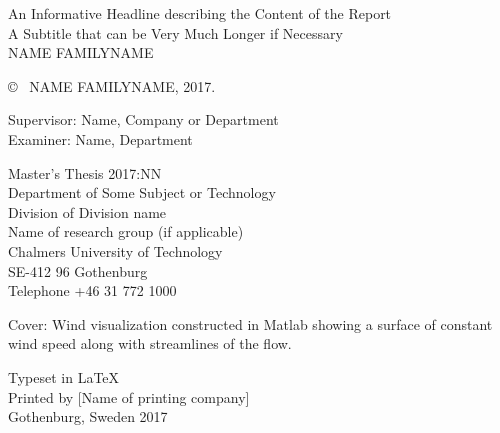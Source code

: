 \newpage
\thispagestyle{plain}
\vspace*{4.5cm}
An Informative Headline describing the Content of the Report\\
A Subtitle that can be Very Much Longer if Necessary\\
NAME FAMILYNAME \setlength{\parskip}{1cm}

\copyright ~ NAME FAMILYNAME, 2017. \setlength{\parskip}{1cm}

Supervisor: Name, Company or Department\\
Examiner: Name, Department \setlength{\parskip}{1cm}

Master's Thesis 2017:NN\\	%
Department of Some Subject or Technology\\
Division of Division name\\
Name of research group (if applicable)\\
Chalmers University of Technology\\
SE-412 96 Gothenburg\\
Telephone +46 31 772 1000 \setlength{\parskip}{0.5cm}

\vfill
Cover: Wind visualization constructed in Matlab showing a surface of constant wind speed along with streamlines of the flow. \setlength{\parskip}{0.5cm}

Typeset in \LaTeX \\
Printed by [Name of printing company]\\
Gothenburg, Sweden 2017

